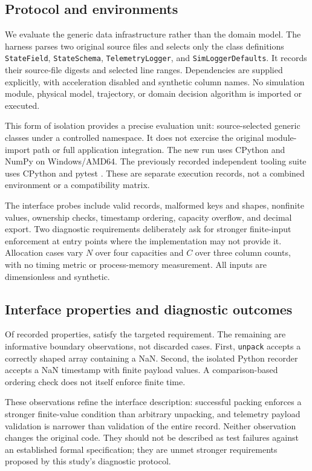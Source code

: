 \documentclass[11pt,a4paper]{article}
\newcommand{\code}[1]{\texttt{#1}}
\begin{document}
\subsection{Protocol and environments}
We evaluate the generic data infrastructure rather than the domain model. The harness parses two original source files and selects only the class definitions \code{StateField}, \code{StateSchema}, \code{TelemetryLogger}, and \code{SimLoggerDefaults}. It records their source-file digests and selected line ranges. Dependencies are supplied explicitly, with acceleration disabled and synthetic column names. No simulation module, physical model, trajectory, or domain decision algorithm is imported or executed.

This form of isolation provides a precise evaluation unit: source-selected generic classes under a controlled namespace. It does not exercise the original module-import path or full application integration. The new run uses CPython \SoftwarePython and NumPy \SoftwareNumpy on Windows/AMD64. The previously recorded independent tooling suite uses CPython \AuditPython and pytest \AuditPytest. These are separate execution records, not a combined environment or a compatibility matrix.

The interface probes include valid records, malformed keys and shapes, nonfinite values, ownership checks, timestamp ordering, capacity overflow, and decimal export. Two diagnostic requirements deliberately ask for stronger finite-input enforcement at entry points where the implementation may not provide it. Allocation cases vary $N$ over four capacities and $C$ over three column counts, with no timing metric or process-memory measurement. All inputs are dimensionless and synthetic.

\subsection{Interface properties and diagnostic outcomes}
Of \SoftwareProbeCount recorded properties, \SoftwareRequirementsMet satisfy the targeted requirement. The remaining \SoftwareLimitations are informative boundary observations, not discarded cases. First, \code{unpack} accepts a correctly shaped array containing a NaN. Second, the isolated Python recorder accepts a NaN timestamp with finite payload values. A comparison-based ordering check does not itself enforce finite time.

These observations refine the interface description: successful packing enforces a stronger finite-value condition than arbitrary unpacking, and telemetry payload validation is narrower than validation of the entire record. Neither observation changes the original code. They should not be described as test failures against an established formal specification; they are unmet stronger requirements proposed by this study's diagnostic protocol.
\end{document}

